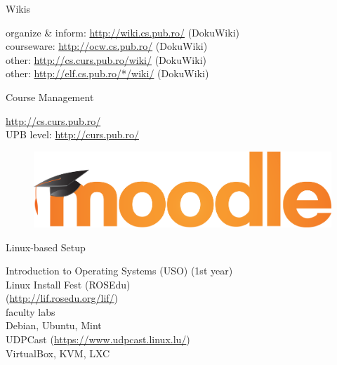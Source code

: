 \documentclass{simple}
\begin{document}
\begin{frame}{Wikis}
  \begin{center}
    {\Large
      \pause organize \& inform: \url{http://wiki.cs.pub.ro/} (DokuWiki) \\
      \vspace{0.3cm}
      \pause courseware: \url{http://ocw.cs.pub.ro/} (DokuWiki) \\
      \vspace{0.3cm}
      \pause other: \url{http://cs.curs.pub.ro/wiki/} (DokuWiki) \\
      \vspace{0.3cm}
      \pause other: \url{http://elf.cs.pub.ro/*/wiki/} (DokuWiki)
    }
  \end{center}
\end{frame}

\begin{frame}{Course Management}
  \begin{center}
    {\Large
      \pause \url{http://cs.curs.pub.ro/} \\
      \vspace{0.3cm}
      \pause UPB level: \url{http://curs.pub.ro/}
      \vspace{0.3cm}
    }
  \pause
  \end{center}
  \begin{figure}
    \centering
      \includegraphics[width=0.6\linewidth]{img/moodle-logo} \\
  \end{figure}
\end{frame}

\begin{frame}{Linux-based Setup}
  \begin{center}
    \pause Introduction to Operating Systems (USO) (1st year) \\
    \vspace{0.3cm}
    \pause Linux Install Fest (ROSEdu)\\
    (\url{http://lif.rosedu.org/lif/}) \\
    \vspace{0.3cm}
    \pause faculty labs \\
    \vspace{0.3cm}
    \pause Debian, Ubuntu, Mint \\
    \vspace{0.3cm}
    \pause UDPCast (\url{https://www.udpcast.linux.lu/}) \\
    \vspace{0.3cm}
    \pause VirtualBox, KVM, LXC
  \end{center}
\end{frame}
\end{document}
